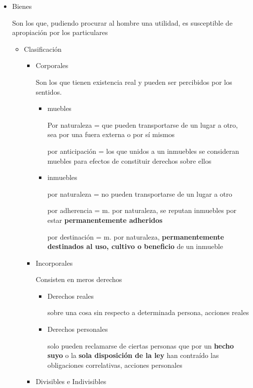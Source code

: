 \documentclass[]{article}
\providecommand{\tightlist}{%
  \setlength{\itemsep}{0pt}\setlength{\parskip}{0pt}}
\begin{document}
\begin{itemize}
\item
  Bienes

  Son los que, pudiendo procurar al hombre una utilidad, es susceptible
  de apropiación por los particulares

  \begin{itemize}
  \tightlist
  \item
    Clasificación

    \begin{itemize}
    \item
      Corporales

      Son los que tienen existencia real y pueden ser percibidos por los
      sentidos.

      \begin{itemize}
      \item
        muebles

        Por naturaleza = que pueden transportarse de un lugar a otro,
        sea por una fuera externa o por sí mismos

        por anticipación = los que unidos a un inmuebles se consideran
        muebles para efectos de constituir derechos sobre ellos
      \item
        inmuebles

        por naturaleza = no pueden transportarse de un lugar a otro

        por adherencia = m. por naturaleza, se reputan inmuebles por
        estar \textbf{permanentemente adheridos}

        por destinación = m. por naturaleza, \textbf{permanentemente
        destinados al uso, cultivo o beneficio} de un inmueble
      \end{itemize}
    \item
      Incorporales

      Consisten en meros derechos

      \begin{itemize}
      \item
        Derechos reales

        sobre una cosa sin respecto a determinada persona, acciones
        reales
      \item
        Derechos personales

        solo pueden reclamarse de ciertas personas que por un
        \textbf{hecho suyo} o la \textbf{sola disposición de la ley} han
        contraído las obligaciones correlativas, acciones personales
      \end{itemize}
    \item
      Divisibles e Indivisibles


\end{itemize}
\end{itemize}
\end{itemize}
\end{document}
